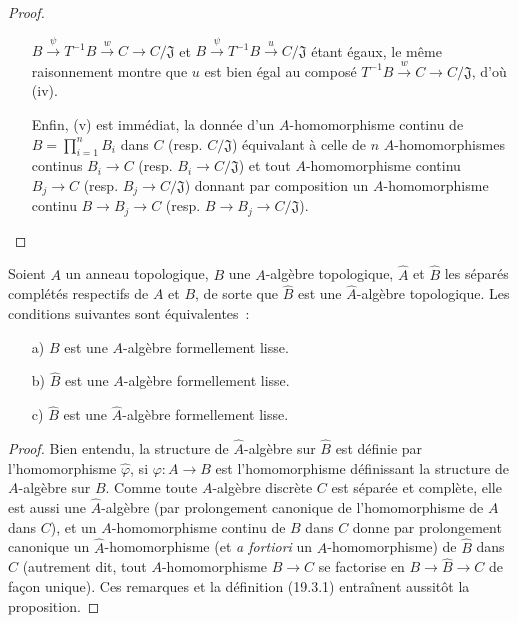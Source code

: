 \begin{proof}
\begin{enumerate}
  $B\xrightarrow{\psi}T^{-1}B\xrightarrow{w}C\to C/\mathfrak J$ et
  $B\xrightarrow{\psi}T^{-1}B\xrightarrow{u}C/\mathfrak J$ étant égaux, le même
  raisonnement montre que $u$ est bien égal au composé
  $T^{-1}B\xrightarrow{w}C\to C/\mathfrak J$, d'où (iv).
  \item[] Enfin, (v) est immédiat, la donnée d'un $A$-homomorphisme
  continu de $B=\prod_{i=1}^n B_i$ dans $C$ (resp. $C/\mathfrak J$)
  équivalant à celle de $n$ $A$-homomorphismes continus $B_i\to C$
  (resp. $B_i\to C/\mathfrak J$) et tout $A$-homomorphisme continu
  $B_j\to C$ (resp. $B_j\to C/\mathfrak J$) donnant par composition un
  $A$-homomorphisme continu $B\to B_j\to C$
  (resp. $B\to B_j\to C/\mathfrak J$).
\end{enumerate}
\end{proof}

\begin{proposition}[19.3.6]
\label{0.19.3.6-fr}
Soient $A$ un anneau topologique, $B$ une $A$-algèbre topologique, $\hat A$
et $\hat B$ les séparés complétés respectifs de $A$ et $B$, de sorte que
$\hat B$ est une $\hat A$-algèbre topologique. Les conditions suivantes
sont équivalentes~:
\begin{enumerate}
  \item[\textup{a)}] $B$ est une $A$-algèbre formellement lisse.
  \item[\textup{b)}] $\hat B$ est une $A$-algèbre formellement lisse.
  \item[\textup{c)}] $\hat B$ est une $\hat A$-algèbre formellement lisse.
\end{enumerate}
\end{proposition}

\begin{proof}
Bien entendu, la structure de $\hat A$-algèbre sur $\hat B$ est définie
par l'homomorphisme $\hat\varphi$, si $\varphi:A\to B$ est
l'homomorphisme définissant la structure de $A$-algèbre sur $B$. Comme toute
$A$-algèbre discrète $C$ est séparée et complète, elle est aussi une
$\hat A$-algèbre (par prolongement canonique de l'homomorphisme de $A$ dans
$C$), et un $A$-homomorphisme continu de $B$ dans $C$ donne par prolongement
canonique un $\hat A$-homomorphisme (et \emph{a fortiori} un
$A$-homomorphisme) de $\hat B$ dans $C$ (autrement dit, tout
$A$-homomorphisme $B\to C$ se factorise en $B\to\hat B\to C$ de façon
unique). Ces remarques et la définition (19.3.1) entraînent aussitôt la
proposition.
\end{proof}

